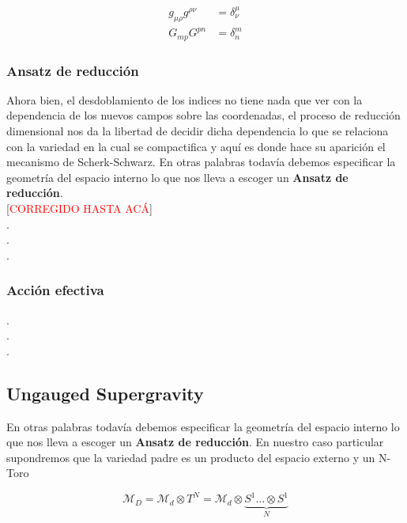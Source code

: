 \documentclass{article}
\numberwithin{equation}{section}
\begin{document}
\begin{equation}\label{inversas}
\begin{aligned}
g_{\mu \rho} g^{\rho \nu} &= \delta^{\mu}_{\nu}\\
G_{m p} G^{p n} &= \delta^m_n
\end{aligned}
\end{equation}

\subsubsection{Ansatz de reducción}


Ahora bien, el desdoblamiento de los indices no tiene nada que ver con la dependencia de los nuevos campos sobre las coordenadas, el proceso de reducción dimensional nos da la libertad de decidir dicha dependencia lo que se relaciona con la variedad en la cual se compactifica y aquí es donde hace su aparición el mecanismo de Scherk-Schwarz. En otras palabras todavía debemos especificar la geometría del espacio interno lo que nos lleva a escoger un \textbf{Ansatz de reducción}.\\

[\textcolor{red}{CORREGIDO HASTA ACÁ}]\\

.\\

.\\

.\\

\subsubsection{Acción efectiva}

.\\

.\\

.\\


\subsection{Ungauged Supergravity}

En otras palabras todavía debemos especificar la geometría del espacio interno lo que nos lleva a escoger un \textbf{Ansatz de reducción}. En nuestro caso particular supondremos que la variedad padre es un producto del espacio externo y un N-Toro

\begin{equation}\label{toro}
\mathcal{M}_D = \mathcal{M}_d \otimes T^N = \mathcal{M}_d \otimes \underbrace{S^1 \dots \otimes S^1}_{N}
\end{equation}
\end{document}
